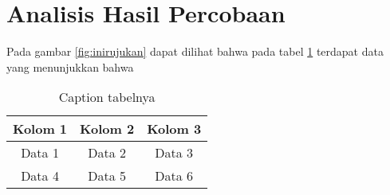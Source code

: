 \section*{Analisis Hasil Percobaan}
\indent
Pada gambar \ref{fig:inirujukan} dapat dilihat bahwa pada tabel \ref{tab:labelini} terdapat data yang menunjukkan bahwa \lipsum[1]
\lipsum[1-2]

\begin{table}[h]
    \centering
    \caption{Caption tabelnya}
    \label{tab:labelini}
    \begin{tabular}{|c|c|c|}
    \hline
    Kolom 1 & Kolom 2 & Kolom 3 \\
    \hline
    Data 1 & Data 2 & Data 3 \\
    Data 4 & Data 5 & Data 6 \\
    \hline
    \end{tabular}
\end{table}